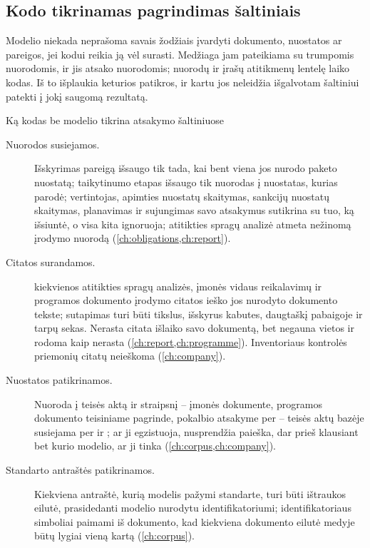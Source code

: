 \subsection{Kodo tikrinamas pagrindimas šaltiniais}\label{sec:control:grounding}

Modelio niekada neprašoma savais žodžiais įvardyti dokumento, nuostatos ar pareigos, jei
kodui reikia ją vėl surasti. Medžiaga jam pateikiama su trumpomis nuorodomis, ir jis atsako
nuorodomis; nuorodų ir įrašų atitikmenų lentelę laiko kodas. Iš to išplaukia keturios patikros,
ir kartu jos neleidžia išgalvotam šaltiniui patekti į jokį saugomą rezultatą.

\begin{codebox}{Ką kodas be modelio tikrina atsakymo šaltiniuose}
\begin{description}
  \item[Nuorodos susiejamos.] Išskyrimas pareigą išsaugo tik tada, kai bent viena jos
     nurodo paketo nuostatą; taikytinumo etapas išsaugo tik nuorodas į
    nuostatas, kurias parodė; vertintojas, apimties nuostatų skaitymas, sankcijų nuostatų
    skaitymas, planavimas ir sujungimas savo atsakymus sutikrina su tuo, ką išsiuntė, o visa
    kita ignoruoja; atitikties spragų analizė atmeta nežinomą įrodymo nuorodą
    (\cref{ch:obligations,ch:report}).
  \item[Citatos surandamos.]  kiekvienos atitikties spragų analizės,
    įmonės vidaus reikalavimų ir programos dokumento įrodymo citatos ieško jos nurodyto
    dokumento tekste; sutapimas turi būti tikslus, išskyrus kabutes, daugtaškį pabaigoje ir
    tarpų sekas. Nerasta citata išlaiko savo dokumentą, bet negauna vietos ir rodoma kaip
    nerasta (\cref{ch:report,ch:programme}). Inventoriaus kontrolės priemonių citatų
    neieškoma (\cref{ch:company}).
  \item[Nuostatos patikrinamos.] Nuoroda į teisės aktą ir straipsnį -- įmonės dokumente,
    programos dokumento teisiniame pagrinde, pokalbio atsakyme per
     -- teisės aktų bazėje susiejama per  ir
    ; ar ji egzistuoja, nusprendžia paieška, dar prieš klausiant bet
    kurio modelio, ar ji tinka (\cref{ch:corpus,ch:company}).
  \item[Standarto antraštės patikrinamos.] Kiekviena antraštė, kurią modelis pažymi
    standarte, turi būti ištraukos eilutė, prasidedanti modelio nurodytu identifikatoriumi;
    identifikatoriaus simboliai paimami iš dokumento, kad kiekviena dokumento eilutė medyje
    būtų lygiai vieną kartą (\cref{ch:corpus}).
\end{description}
\end{codebox}

